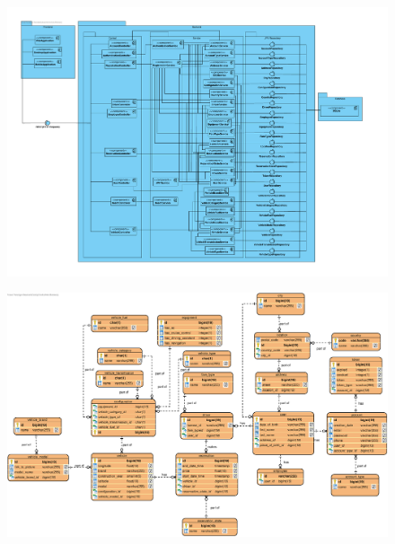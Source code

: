


\thispagestyle{empty}

\begin{landscape}
    \begin{figure}[H]
        \centering
        \includegraphics[width = 1.4\textwidth]{pictures/fastlane_komponentendiagramm}
        \label{fig:anhang_komponentendiagramm}
    \end{figure}
\end{landscape}

\begin{landscape}
    \begin{figure}[H]
        \centering
        \includegraphics[width = 1.4\textwidth]{pictures/Fastlane-ERD}
        \label{fig:anhang_erd}
    \end{figure}
\end{landscape}

